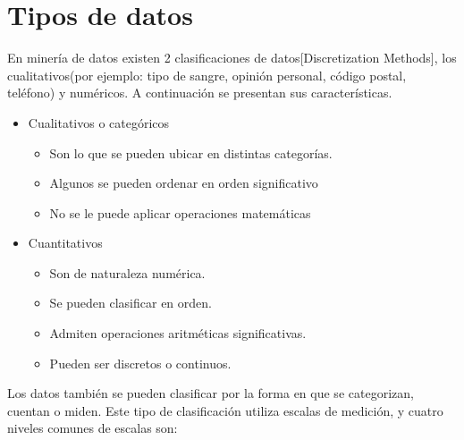 \section{Tipos de datos}

En miner\'ia de datos existen 2 clasificaciones de datos[Discretization Methods], los cualitativos(por ejemplo: tipo de sangre, opini\'on personal, c\'odigo postal, tel\'efono) y num\'ericos. A continuaci\'on se presentan sus caracter\'isticas.

\begin{itemize}
\item Cualitativos o categ\'oricos 
	\begin{itemize}
	\item Son lo que se pueden ubicar en distintas  categor\'ias.
	\item Algunos se pueden ordenar en orden significativo
	\item No se le puede aplicar operaciones matem\'aticas
	\end{itemize}
	 

\item Cuantitativos
	\begin{itemize}
	\item Son de naturaleza num\'erica. 
	\item Se pueden clasificar en orden. 
	\item Admiten operaciones aritm\'eticas significativas. 
	\item Pueden ser discretos o continuos.		
	\end{itemize}
\end{itemize}

Los datos tambi\'en se pueden clasificar por la forma en que se categorizan, cuentan o miden. Este tipo de clasificaci\'on utiliza escalas de medici\'on, y cuatro niveles comunes de escalas son: 

